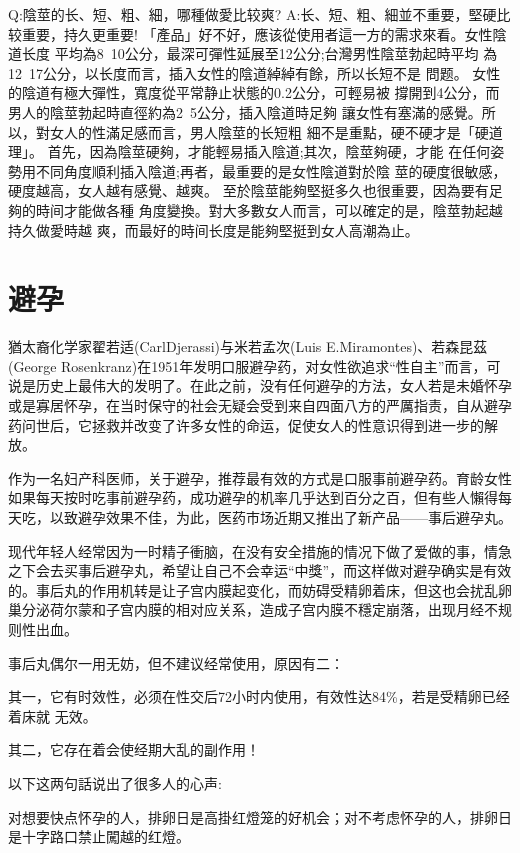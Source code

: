 \documentclass[12pt,UTF8]{ctexbook}
\begin{document}
Q:陰莖的长、短、粗、細，哪種做愛比较爽?
A:长、短、粗、細並不重要，堅硬比较重要，持久更重要!
「產品」好不好，應该從使用者這一方的需求來看。女性陰道长度
平均為8~10公分，最深可彈性延展至12公分;台灣男性陰莖勃起時平均
為12~17公分，以长度而言，插入女性的陰道綽綽有餘，所以长短不是
問题。
女性的陰道有極大彈性，寬度從平常静止状態的0.2公分，可輕易被
撐開到4公分，而男人的陰莖勃起時直徑約為2~5公分，插入陰道時足夠
讓女性有塞滿的感覺。所以，對女人的性滿足感而言，男人陰莖的长短粗
細不是重點，硬不硬才是「硬道理」。
首先，因為陰莖硬夠，才能輕易插入陰道;其次，陰莖夠硬，才能
在任何姿勢用不同角度順利插入陰道;再者，最重要的是女性陰道對於陰
莖的硬度很敏感，硬度越高，女人越有感覺、越爽。
至於陰莖能夠堅挺多久也很重要，因為要有足夠的時间才能做各種
角度變換。對大多數女人而言，可以確定的是，陰莖勃起越持久做愛時越
爽，而最好的時间长度是能夠堅挺到女人高潮為止。



\chapter{避孕}

猶太裔化学家翟若适(CarlDjerassi)与米若孟次(Luis E.Miramontes)、若森昆茲(George Rosenkranz)在1951年发明口服避孕药，对女性欲追求“性自主”而言，可说是历史上最伟大的发明了。在此之前，没有任何避孕的方法，女人若是未婚怀孕或是寡居怀孕，在当时保守的社会无疑会受到来自四面八方的严厲指责，自从避孕药问世后，它拯救并改变了许多女性的命运，促使女人的性意识得到进一步的解放。

作为一名妇产科医师，关于避孕，推荐最有效的方式是口服事前避孕药。育龄女性如果每天按时吃事前避孕药，成功避孕的机率几乎达到百分之百，但有些人懶得每天吃，以致避孕效果不佳，为此，医药市场近期又推出了新产品——事后避孕丸。

现代年轻人经常因为一时精子衝脑，在没有安全措施的情况下做了爱做的事，情急之下会去买事后避孕丸，希望让自己不会幸运“中獎”，而这样做对避孕确实是有效的。事后丸的作用机转是让子宫内膜起变化，而妨碍受精卵着床，但这也会扰乱卵巢分泌荷尔蒙和子宫内膜的相对应关系，造成子宫内膜不穩定崩落，出现月经不规则性出血。

事后丸偶尔一用无妨，但不建议经常使用，原因有二：

其一，它有时效性，必须在性交后72小时内使用，有效性达84\%，若是受精卵已经着床就
无效。

其二，它存在着会使经期大乱的副作用！

以下这两句話说出了很多人的心声:

对想要快点怀孕的人，排卵日是高掛红燈笼的好机会；对不考虑怀孕的人，排卵日是十字路口禁止闖越的红燈。
\end{document}
